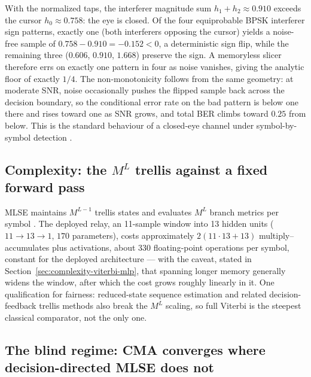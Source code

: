 With the normalized taps, the interferer magnitude sum $h_1 + h_2 \approx 0.910$ exceeds the cursor $h_0 \approx 0.758$: the eye is closed. Of the four equiprobable BPSK interferer sign patterns, exactly one (both interferers opposing the cursor) yields a noise-free sample of $0.758 - 0.910 = -0.152 < 0$, a deterministic sign flip, while the remaining three ($0.606$, $0.910$, $1.668$) preserve the sign. A memoryless slicer therefore errs on exactly one pattern in four as noise vanishes, giving the analytic floor of exactly $1/4$. The non-monotonicity follows from the same geometry: at moderate SNR, noise occasionally pushes the flipped sample back across the decision boundary, so the conditional error rate on the bad pattern is below one there and rises toward one as SNR grows, and total BER climbs toward $0.25$ from below. This is the standard behaviour of a closed-eye channel under symbol-by-symbol detection \cite{LuckySalzWeldon1968, ProakisSalehi2008DigitalComm}.

\subsection{Complexity: the $M^{L}$ trellis against a fixed forward pass}

MLSE maintains $M^{L-1}$ trellis states and evaluates $M^{L}$ branch metrics per symbol \cite{Forney1972MLSE, ProakisSalehi2008DigitalComm}. The deployed relay, an 11-sample window into 13 hidden units ($11 \to 13 \to 1$, $170$ parameters), costs approximately $2(11 \cdot 13 + 13)$ multiply--accumulates plus activations, about 330 floating-point operations per symbol, constant for the deployed architecture --- with the caveat, stated in Section~\ref{sec:complexity-viterbi-mlp}, that spanning longer memory generally widens the window, after which the cost grows roughly linearly in it. One qualification for fairness: reduced-state sequence estimation \cite{EyuboqluQureshi1988RSSE} and related decision-feedback trellis methods also break the $M^{L}$ scaling, so full Viterbi is the steepest classical comparator, not the only one.

\subsection{The blind regime: CMA converges where decision-directed MLSE does not}

